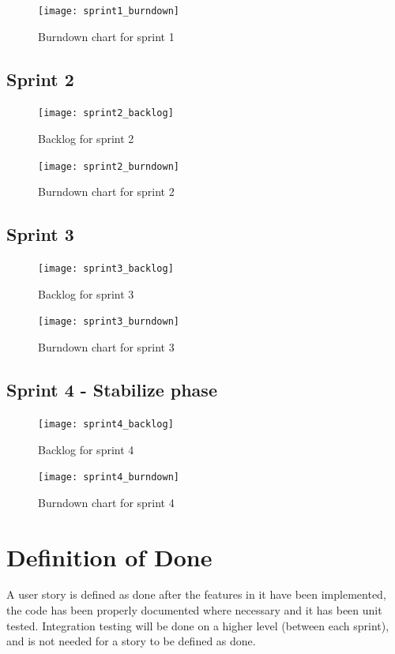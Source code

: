 \documentclass[a4paper,12pt]{article}
\begin{document}
\begin{figure}[H]
	\centering
	\texttt{[image: sprint1\_burndown]}
	\caption{Burndown chart for sprint 1}
\end{figure}

\subsection{Sprint 2}
\begin{figure}[H]
	\centering
	\texttt{[image: sprint2\_backlog]}
	\caption{Backlog for sprint 2}
\end{figure}

\begin{figure}[H]
	\centering
	\texttt{[image: sprint2\_burndown]}
	\caption{Burndown chart for sprint 2}
\end{figure}

\subsection{Sprint 3}
\begin{figure}[H]
	\centering
	\texttt{[image: sprint3\_backlog]}
	\caption{Backlog for sprint 3}
\end{figure}

\begin{figure}[H]
	\centering
	\texttt{[image: sprint3\_burndown]}
	\caption{Burndown chart for sprint 3}
\end{figure}

\subsection{Sprint 4 - Stabilize phase}
\begin{figure}[H]
	\centering
	\texttt{[image: sprint4\_backlog]}
	\caption{Backlog for sprint 4}
\end{figure}

\begin{figure}[H]
	\centering
	\texttt{[image: sprint4\_burndown]}
	\caption{Burndown chart for sprint 4}
\end{figure}

\section{Definition of Done}
A user story is defined as done after the features in it have been implemented,
the code has been properly documented where necessary and it has been
unit tested. Integration testing will be done on a higher level (between each
sprint), and is not needed for a story to be defined as done.
\end{document}
